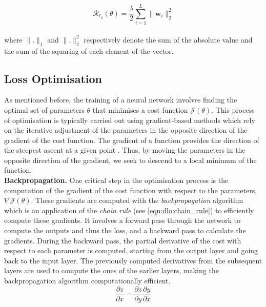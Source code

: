 \begin{equation}
  \label{eqn:dlo:reg_l2}
  \mathcal{R}_{\ell_2}(\theta) = \frac{\lambda}{2} \displaystyle \sum_{i=1}^{L} \| \mathbf{w}_i \|_2^2 
\end{equation}\\

\noindent where $\|. \|_1$ and $\|.\|_2^2$ respectively denote the sum of
the absolute value and the sum of the squaring of each element of the vector.\\

\subsection{Loss Optimisation}\label{sec:dlo:backpropagation}

As mentioned before, the training of a neural network involves finding the
optimal set of parameters $\theta$ that minimises a cost function
$\mathcal{J}(\theta)$. This process of optimisation is typically carried out
using gradient-based methods which rely on the iterative adjustment of the
parameters in the opposite direction of the gradient of the cost function. The
gradient of a function provides the direction of the steepest ascent at a given
point \cite{boyd2004convex}. Thus, by moving the parameters in the opposite
direction of the gradient, we seek to descend to a local minimum of the
function.\\

\noindent \textbf{Backpropagation.} One critical step in the optimisation
process is the computation of the gradient of the cost function with respect to
the parameters, $\nabla \mathcal{J}(\theta)$. These gradients are computed with
the \emph{backpropagation} algorithm \cite{rumelhart1986learning} which is an
application of the \emph{chain rule} (see \cref{eqn:dlo:chain_rule}) to
efficiently compute these gradients. It involves a forward pass through the
network to compute the outputs and thus the loss, and a backward pass to
calculate the gradients. During the backward pass, the partial derivative of the
cost with respect to each parameter is computed, starting from the output layer
and going back to the input layer. The previously computed derivatives from the
subsequent layers are used to compute the ones of the earlier layers,  
making the backpropagation algorithm computationally efficient.\\

\begin{equation}
  \label{eqn:dlo:chain_rule}
  \frac{\partial z}{\partial x} = \frac{\partial z}{\partial y} \frac{\partial y}{\partial x}
\end{equation}\\

